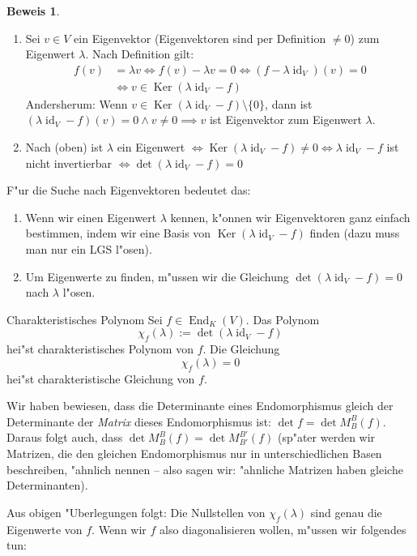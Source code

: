 \documentclass[oneside,fontsize=11pt,paper=a4,BCOR=0mm,DIV=12,automark,headsepline]{scrbook}
\newcommand{\gq}[1]{\glqq{}#1\grqq{}} %
\DeclareMathOperator{\mKer}{Ker}
\DeclareMathOperator{\mId}{id}
\DeclareMathOperator{\mEnd}{End}
\theoremstyle{remark}
\theoremstyle{definition}
\theoremstyle{definition}
\newtheorem*{prof}{Beweis}
\theoremstyle{remark}
\begin{document}
\begin{prof}
  \begin{enumerate}
  \item Sei \(v\in V\) ein Eigenvektor (Eigenvektoren sind per Definition \(\neq 0\)) zum Eigenwert \(\lambda\). Nach Definition gilt:
    \begin{align*}
      f(v) &= \lambda v \iff f(v) - \lambda v = 0 \iff (f - \lambda\mId_V)(v) = 0 \\
           &\iff v\in \mKer(\lambda\mId_V - f)
    \end{align*}
    Andersherum: Wenn \(v \in \mKer(\lambda\mId_V -f)\setminus\{0\}\), dann ist \((\lambda\mId_V -f)(v)=0\land v\neq 0 \implies v\) ist Eigenvektor zum Eigenwert \(\lambda\).
  \item Nach (oben) ist \(\lambda\) ein Eigenwert \(\iff\mKer(\lambda\mId_V -f)\neq 0\)\(\iff \lambda\mId_V -f\) ist nicht invertierbar \(\iff\det(\lambda\mId_V - f) = 0\)
  \end{enumerate}
\end{prof}
F"ur die Suche nach Eigenvektoren bedeutet das:
\begin{enumerate}
\item Wenn wir einen Eigenwert \(\lambda\) kennen, k"onnen wir Eigenvektoren ganz einfach bestimmen, indem wir eine Basis von \(\mKer(\lambda\mId_V -f)\) finden (dazu muss man nur ein LGS l"osen).
\item Um Eigenwerte zu finden, m"ussen wir die Gleichung \(\det(\lambda\mId_V - f) = 0\) nach \(\lambda\) l"osen.
\end{enumerate}
\begin{definition}{Charakteristisches Polynom}{}
  Sei \(f\in\mEnd_K(V)\). Das Polynom \[\chi_f(\lambda) := \det(\lambda\mId_V-f)\] hei"st charakteristisches Polynom von \(f\). Die Gleichung \[\chi_f(\lambda) = 0\] hei"st charakteristische Gleichung von \(f\).
\end{definition}
\begin{comm}
  Wir haben bewiesen, dass die Determinante eines Endomorphismus gleich der Determinante der \emph{Matrix} dieses Endomorphismus ist: \(\det f = \det M_B^B(f)\). Daraus folgt auch, dass \(\det M_B^B(f) = \det M_{B'}^{B'}(f)\) (sp"ater werden wir Matrizen, die den gleichen Endomorphismus nur in unterschiedlichen Basen beschreiben, \gq{"ahnlich} nennen -- also sagen wir: "ahnliche Matrizen haben gleiche Determinanten).
\end{comm}
Aus obigen "Uberlegungen folgt: Die Nullstellen von \(\chi_f(\lambda)\) sind genau die Eigenwerte von \(f\). Wenn wir \(f\) also diagonalisieren wollen, m"ussen wir folgendes tun:
\end{document}
